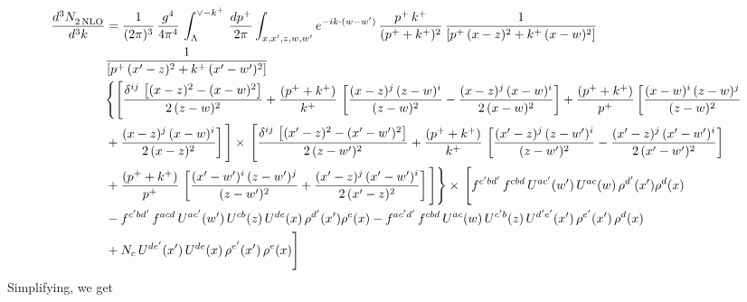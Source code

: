 \documentclass[9pt]{article}
\numberwithin{equation}{section}
\begin{document}
\begin{align}
    \frac{d^{3}N_{2\,\rm NLO}^{\rm}}{d^{3}k}  & = \frac{1}{(2\pi)^{3}}\, \frac{g^{4}}{4\pi^{4}}\,\int_{\Lambda}^{\vee-k^{+}}\, \frac{dp^{+}}{2\pi}\int_{x,x',z,w,w^{\prime}} e^{-ik\cdot (w-w')}\,\frac{p^{+}\,k^{+}}{(p^{+}+k^{+})^{2}}\, \frac{1}{\left[p^{+}\,(x-z)^{2}+k^{+}\,(x-w)^{2}\right]}\,\notag \\ & \frac{1}{\left[p^{+}\,(x'-z)^{2}+k^{+}\,(x'-w')^{2}\right]}\notag \\ & \Bigg\{\Bigg[\frac{\delta^{ij}\, \left[(x-z)^{2}-(x-w)^{2}\right]}{2\,(z-w)^{2}} + \frac{(p^{+}+k^{+})}{k^{+}}\, \left[\frac{(x-z)^{j}\,(z-w)^{i}}{(z-w)^{2}}-\frac{(x-z)^{j}\,(x-w)^{i}}{2\,(x-w)^{2}}\right]+\frac{(p^{+}+k^{+})}{p^{+}}\,\bigg[\frac{(x-w)^{i}\,(z-w)^{j}}{(z-w)^{2}}\notag \\ & +\frac{(x-z)^{j}\,(x-w)^{i}}{2\,(x-z)^{2}}\bigg]\,\Bigg]\times\, \Bigg[\frac{\delta^{ij}\, \left[(x'-z)^{2}-(x'-w')^{2}\right]}{2\,(z-w')^{2}}+ \frac{(p^{+}+k^{+})}{k^{+}}\, \left[\frac{(x'-z)^{j}\,(z-w')^{i}}{(z-w')^{2}}-\frac{(x'-z)^{j}\,(x'-w')^{i}}{2\,(x'-w')^{2}}\right]\notag \\ & +\frac{(p^{+}+k^{+})}{p^{+}}\,\left[\frac{(x'-w')^{i}\,(z-w')^{j}}{(z-w')^{2}} +\frac{(x'-z)^{j}\,(x'-w')^{i}}{2\,(x'-z)^{2}}\right] \Bigg] \Bigg\} \times\,  \Bigg[f^{c'bd'}\,f^{cbd}\, U^{ac'}(w')\,U^{ac}(w)\,\rho^{d'}(x')\rho^{d}(x)\notag \\ & - f^{c'bd'}\,f^{acd}\,U^{ac'}(w')\,U^{cb}(z)\,U^{de}(x)\,\rho^{d'}(x')\rho^{e}(x) -f^{ac'd'}\,f^{cbd}\,U^{ac}(w)\,U^{c'b}(z)\,U^{d'e'}(x')\,\rho^{e'}(x')\,\rho^{d}(x)\notag \\ & +N_{c}\,U^{de'}(x')\,U^{de}(x)\,\rho^{e'}(x')\,\rho^{e}(x)\Bigg]
\end{align}
Simplifying, we get
\end{document}
